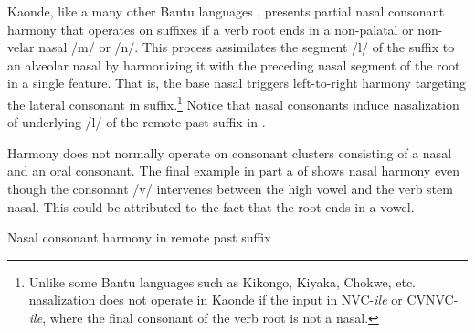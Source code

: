 \documentclass[output=paper]{langsci/langscibook}
\begin{document}
\begin{styleBodyTextIndent}
Kaonde, like a many other Bantu languages \citep{Greenberg1951}, presents partial nasal consonant harmony that operates on suffixes if a verb root ends in a non-palatal or non-velar nasal /m/ or /n/. This process assimilates the segment /l/ of the suffix to an alveolar nasal by harmonizing it with the preceding nasal segment of the root in a single feature. That is, the base nasal triggers left-to-right harmony targeting the lateral consonant in suffix.\footnote{ Unlike some Bantu languages such as Kikongo, Kiyaka, Chokwe, etc. nasalization does not operate in Kaonde if the input in NVC-\textit{ile} or CVNVC-\textit{ile}, where the final consonant of the verb root is not a nasal.  } Notice that nasal consonants induce nasalization of underlying /l/ of the remote past suffix in . 
\end{styleBodyTextIndent}

\begin{styleBodyTextIndent}
Harmony does not normally operate on consonant clusters consisting of a nasal and an oral consonant. The final example in part a of  shows nasal harmony even though the consonant /v/ intervenes between the high vowel and the verb stem nasal. This could be attributed to the fact that the root ends in a vowel. 
\end{styleBodyTextIndent}

\begin{stylelsTableHeading}%
\begin{table}
\caption{Nasal consonant harmony in remote past suffix}
\label{tab:4}
\end{table}\end{stylelsTableHeading}
\end{document}
